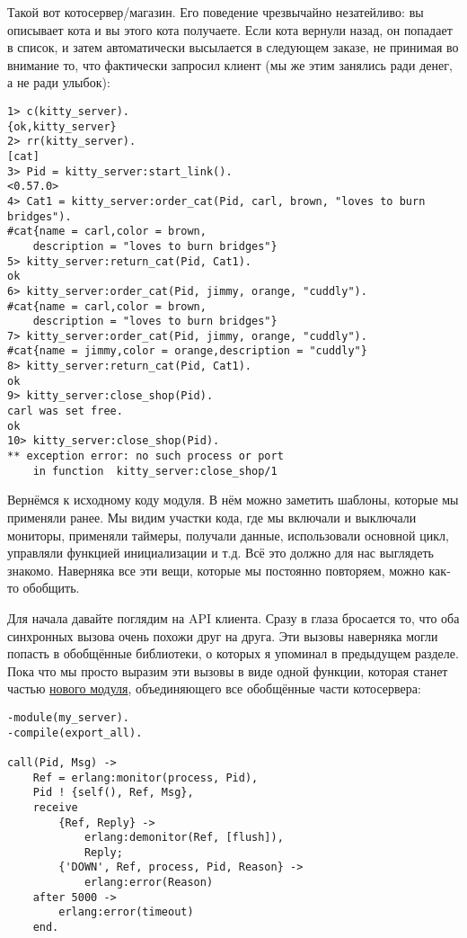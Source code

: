 Такой вот котосервер/магазин.
Его поведение чрезвычайно незатейливо: вы описывает кота и вы этого кота получаете.
Если кота вернули назад, он попадает в список, и затем автоматически высылается в следующем заказе, не принимая во внимание то, что фактически запросил клиент (мы же этим занялись ради денег, а не ради улыбок): \begin{lstlisting}[style=erlang]
1> c(kitty_server). 
{ok,kitty_server}
2> rr(kitty_server).
[cat]
3> Pid = kitty_server:start_link().
<0.57.0>
4> Cat1 = kitty_server:order_cat(Pid, carl, brown, "loves to burn bridges").
#cat{name = carl,color = brown,
    description = "loves to burn bridges"}
5> kitty_server:return_cat(Pid, Cat1).
ok
6> kitty_server:order_cat(Pid, jimmy, orange, "cuddly").
#cat{name = carl,color = brown,
    description = "loves to burn bridges"}
7> kitty_server:order_cat(Pid, jimmy, orange, "cuddly").
#cat{name = jimmy,color = orange,description = "cuddly"}
8> kitty_server:return_cat(Pid, Cat1).
ok
9> kitty_server:close_shop(Pid).
carl was set free.
ok
10> kitty_server:close_shop(Pid).
** exception error: no such process or port
    in function  kitty_server:close_shop/1
\end{lstlisting}

Вернёмся к исходному коду модуля.
В нём можно заметить шаблоны, которые мы применяли ранее.
Мы видим участки кода, где мы включали и выключали мониторы, применяли таймеры, получали данные, использовали основной цикл, управляли функцией инициализации и т.д.
Всё это должно для нас выглядеть знакомо.
Наверняка все эти вещи, которые мы постоянно повторяем, можно как\--то обобщить.

Для начала давайте поглядим на API клиента.
Сразу в глаза бросается то, что оба синхронных вызова очень похожи друг на друга.
Эти вызовы наверняка могли попасть в обобщённые библиотеки, о которых я упоминал в предыдущем разделе.
Пока что мы просто выразим эти вызовы в виде одной функции, которая станет частью \href{http://learnyousomeerlang.com/static/erlang/my\_server.erl}{нового модуля}, объединяющего все обобщённые части котосервера:
\begin{lstlisting}[style=erlang]
-module(my_server).
-compile(export_all).
 
call(Pid, Msg) ->
    Ref = erlang:monitor(process, Pid),
    Pid ! {self(), Ref, Msg},
    receive
        {Ref, Reply} ->
            erlang:demonitor(Ref, [flush]),
            Reply;
        {'DOWN', Ref, process, Pid, Reason} ->
            erlang:error(Reason)
    after 5000 ->
        erlang:error(timeout)
    end.
\end{lstlisting}

